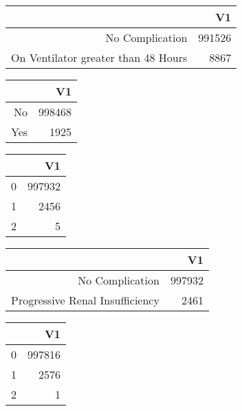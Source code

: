 \bigskip\bigskip
\centering
\begin{tabular}{rr}
  \hline
 & V1 \\ 
  \hline
No Complication & 991526 \\ 
  On Ventilator greater than 48 Hours & 8867 \\ 
   \hline
\end{tabular}

\bigskip\bigskip
\centering
\begin{tabular}{rr}
  \hline
 & V1 \\ 
  \hline
No & 998468 \\ 
  Yes & 1925 \\ 
   \hline
\end{tabular}

\bigskip\bigskip
\centering
\begin{tabular}{rr}
  \hline
 & V1 \\ 
  \hline
0 & 997932 \\ 
  1 & 2456 \\ 
  2 &   5 \\ 
   \hline
\end{tabular}

\bigskip\bigskip
\centering
\begin{tabular}{rr}
  \hline
 & V1 \\ 
  \hline
No Complication & 997932 \\ 
  Progressive Renal Insufficiency & 2461 \\ 
   \hline
\end{tabular}

\bigskip\bigskip
\centering
\begin{tabular}{rr}
  \hline
 & V1 \\ 
  \hline
0 & 997816 \\ 
  1 & 2576 \\ 
  2 &   1 \\ 
   \hline
\end{tabular}

